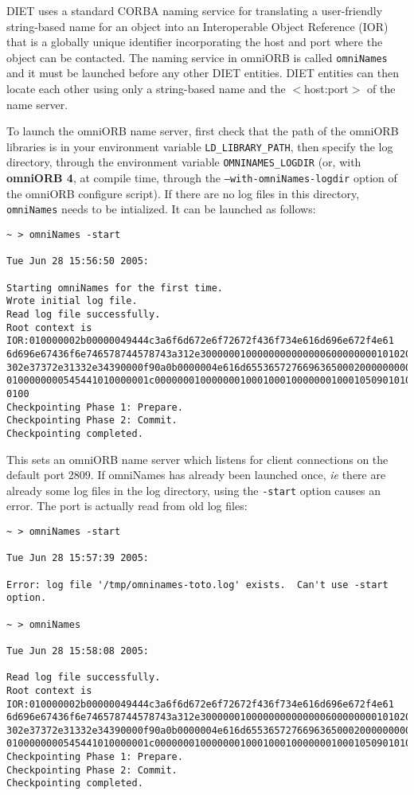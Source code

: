 DIET uses a standard CORBA naming service for translating a
user-friendly string-based name for an object into an Interoperable
Object Reference (IOR) that is a globally unique identifier
incorporating the host and port where the object can be contacted.
The naming service in omniORB is called \texttt{omniNames} and it
must be launched before any other DIET entities.  DIET entities can
then locate each other using only a string-based name and the
$<$host:port$>$ of the name server.

To launch the omniORB name server, first check that the path of the omniORB
libraries is in your environment variable \texttt{LD\_LIBRARY\_PATH}, then
specify the log directory, through the environment variable
\texttt{OMNINAMES\_LOGDIR} (or, with \textbf{omniORB 4}, at compile time,
through the \texttt{--with-omniNames-logdir} option of the omniORB configure
script). If there are no log files in this directory,
\texttt{omniNames} needs to be intialized. It can be launched as
follows: 
{\footnotesize
\begin{verbatim}
~ > omniNames -start

Tue Jun 28 15:56:50 2005:

Starting omniNames for the first time.
Wrote initial log file.
Read log file successfully.
Root context is IOR:010000002b00000049444c3a6f6d672e6f72672f436f734e616d696e672f4e61
6d696e67436f6e746578744578743a312e300000010000000000000060000000010102000d0000003134
302e37372e31332e34390000f90a0b0000004e616d655365727669636500020000000000000008000000
0100000000545441010000001c0000000100000001000100010000000100010509010100010000000901
0100
Checkpointing Phase 1: Prepare.
Checkpointing Phase 2: Commit.
Checkpointing completed.
\end{verbatim}
}

This sets an omniORB name server which listens for client connections
on the default port 2809. If omniNames has already been launched once,
\emph{ie} there are already some log files in the log directory, using
the \texttt{-start} option causes an error. The port is actually read
from old log files: {\footnotesize
\begin{verbatim}
~ > omniNames -start

Tue Jun 28 15:57:39 2005:

Error: log file '/tmp/omninames-toto.log' exists.  Can't use -start option.

~ > omniNames  

Tue Jun 28 15:58:08 2005:

Read log file successfully.
Root context is IOR:010000002b00000049444c3a6f6d672e6f72672f436f734e616d696e672f4e61
6d696e67436f6e746578744578743a312e300000010000000000000060000000010102000d0000003134
302e37372e31332e34390000f90a0b0000004e616d655365727669636500020000000000000008000000
0100000000545441010000001c0000000100000001000100010000000100010509010100010000000901
Checkpointing Phase 1: Prepare.
Checkpointing Phase 2: Commit.
Checkpointing completed.
\end{verbatim}
}

